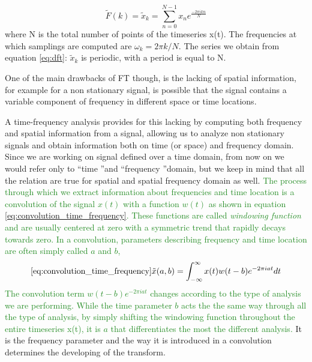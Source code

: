 \documentclass[11pt]{report}
\begin{document}
\begin{equation}\label{eq:dft}
 \tilde{F}(k) = \tilde{x}_k = \sum_{n = 0}^{N-1}x_n e^{\frac{-2\pi i k n}{N}}
\end{equation}
where N is the total number of points of the timeseries x(t).
The frequencies at which samplings are computed are $\omega_k = 2\pi k/N$.
The series we obtain from equation \ref{eq:dft}: $\tilde{x}_k$ is periodic, with a period is equal to N.

One of the main drawbacks of FT though, is the lacking of spatial information, for example for a non stationary signal, is possible that the signal contains a variable component of frequency in different space or time locations.

A time-frequency analysis provides for this lacking by computing both frequency and spatial information from a signal, allowing us to analyze non stationary signals and obtain information both on time (or space) and frequency domain.
Since we are working on signal defined over a time domain, from now on we would refer only to  \textquotedblleft time \textquotedblright  and  \textquotedblleft frequency \textquotedblright domain, but we keep in mind that all the relation are true for spatial and spatial frequency domain as well.
\textcolor{ForestGreen}{
The process through which we extract information about frequencies and time location is a convolution of the signal $x(t)$ with a function $w(t)$ as shown in equation \ref{eq:convolution_time_frequency}.
These functions are called \emph{windowing function} and are usually centered at zero with a symmetric trend that rapidly decays towards zero.
In a convolution, parameters describing frequency and time location are often simply called $a$ and $b$,
\begin{equation}\ref{eq:convolution_time_frequency}
\tilde{x}(a, b) = \int_{-\infty}^{\infty} x(t)w(t-b) e^{-2\pi i a t} dt
\end{equation}
The convolution term $w(t-b) e^{-2\pi i a t}$ changes according to the type of analysis we are performing.
While the time parameter $b$ acts the the same way through all the type of analysis, by simply shifting the windowing function throughout the entire timeseries x(t), it is $a$ that differentiates the most the different analysis.
}
It is the frequency parameter and the way it is introduced in a convolution determines the developing of the transform.
\end{document}

